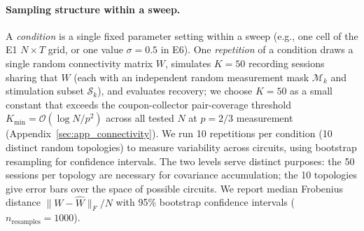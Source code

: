 \documentclass{article}
\begin{document}
\paragraph{Sampling structure within a sweep.}
A \emph{condition} is a single fixed parameter setting within a sweep (e.g., one cell of the E1 $N{\times}T$ grid, or one value $\sigma=0.5$ in E6).
One \emph{repetition} of a condition draws a single random connectivity matrix $W$, simulates $K=50$ recording sessions sharing that $W$ (each with an independent random measurement mask $\mathcal{M}_k$ and stimulation subset $\mathcal{S}_k$), and evaluates recovery; we choose $K=50$ as a small constant that exceeds the coupon-collector pair-coverage threshold $K_{\min} \!=\! \mathcal{O}(\log N / p^2)$ across all tested $N$ at $p=2/3$ measurement (Appendix~\ref{sec:app_connectivity}).
We run 10 repetitions per condition (10 distinct random topologies) to measure variability across circuits, using bootstrap resampling for confidence intervals.
The two levels serve distinct purposes: the 50 sessions per topology are necessary for covariance accumulation; the 10 topologies give error bars over the space of possible circuits.
We report median Frobenius distance $\|W - \hat{W}\|_F / N$ with 95\% bootstrap confidence intervals ($n_{\text{resamples}}=1000$).
\end{document}
